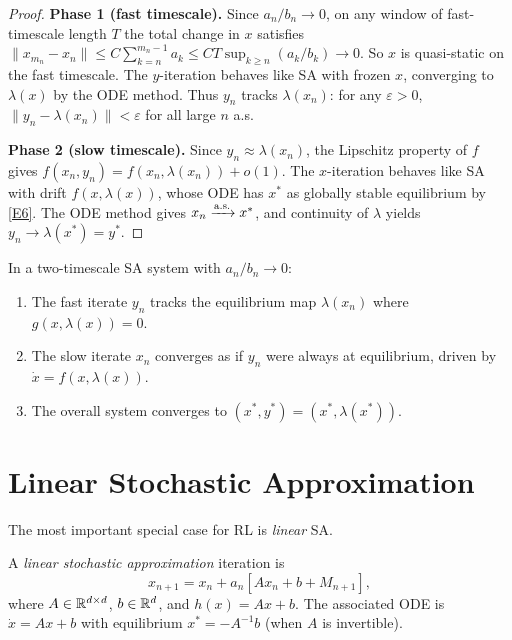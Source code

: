 \documentclass[11pt,a4paper]{article}
\begin{document}
\begin{proof}
\noindent\textbf{Phase 1 (fast timescale).}
Since $a_n/b_n \to 0$, on any window of fast-timescale length $T$
the total change in $x$ satisfies $\|x_{m_n} - x_n\| \leq
C\sum_{k=n}^{m_n-1}a_k \leq CT\sup_{k \geq n}(a_k/b_k) \to 0$.
So $x$ is quasi-static on the fast timescale. The $y$-iteration
behaves like SA with frozen $x$, converging to $\lambda(x)$ by the
ODE method. Thus $y_n$ tracks $\lambda(x_n)$: for any $\varepsilon > 0$,
$\|y_n - \lambda(x_n)\| < \varepsilon$ for all large $n$ a.s.

\medskip\noindent\textbf{Phase 2 (slow timescale).}
Since $y_n \approx \lambda(x_n)$, the Lipschitz property of $f$
gives $f(x_n,y_n) = f(x_n,\lambda(x_n)) + o(1)$. The $x$-iteration
behaves like SA with drift $f(x,\lambda(x))$, whose ODE has $x^*$
as globally stable equilibrium by \ref{E6}. The ODE method gives
$x_n \xrightarrow{\text{a.s.}} x^*$, and continuity of $\lambda$ yields
$y_n \to \lambda(x^*) = y^*$.
\end{proof}

\begin{keyresult}[title={Two-Timescale Convergence}]
In a two-timescale SA system with $a_n/b_n \to 0$:
\begin{enumerate}[nosep]
  \item The fast iterate $y_n$ tracks the equilibrium map
    $\lambda(x_n)$ where $g(x, \lambda(x)) = 0$.
  \item The slow iterate $x_n$ converges as if $y_n$ were always
    at equilibrium, driven by $\dot{x} = f(x, \lambda(x))$.
  \item The overall system converges to
    $(x^*, y^*) = (x^*, \lambda(x^*))$.
\end{enumerate}
\end{keyresult}


\section{Linear Stochastic Approximation}
\label{sec:linear-sa}

The most important special case for RL is \emph{linear} SA.

\begin{definition}[Linear SA]
\label{def:linear-sa}
A \emph{linear stochastic approximation} iteration is
\begin{equation}
\label{eq:linear-sa}
  x_{n+1} = x_n + a_n[Ax_n + b + M_{n+1}],
\end{equation}
where $A \in \mathbb{R}^{d \times d}$, $b \in \mathbb{R}^d$, and $h(x) = Ax + b$.
The associated ODE is $\dot{x} = Ax + b$ with equilibrium
$x^* = -A^{-1}b$ (when $A$ is invertible).
\end{definition}
\end{document}
